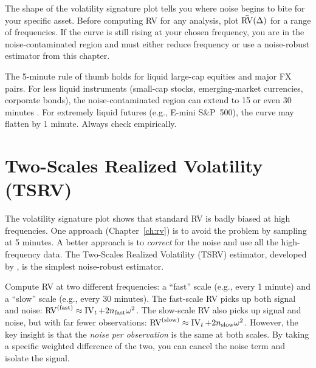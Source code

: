 \begin{keyidea}
The shape of the volatility signature plot tells you where noise begins to bite for your specific asset.
Before computing RV for any analysis, plot $\bar{\operatorname{RV}}(\Delta)$ for a range of frequencies.
If the curve is still rising at your chosen frequency, you are in the noise-contaminated region and must either reduce frequency or use a noise-robust estimator from this chapter.
\end{keyidea}

\begin{warning}
The 5-minute rule of thumb holds for liquid large-cap equities and major FX pairs.
For less liquid instruments (small-cap stocks, emerging-market currencies, corporate bonds), the noise-contaminated region can extend to 15 or even 30 minutes \citep{HansenLunde2006}.
For extremely liquid futures (e.g., E-mini S\&P~500), the curve may flatten by 1 minute.
Always check empirically.
\end{warning}


\section{Two-Scales Realized Volatility (TSRV)}
\label{sec:tsrv}

The volatility signature plot shows that standard RV is badly biased at high frequencies.
One approach (Chapter~\ref{ch:rv}) is to avoid the problem by sampling at 5 minutes.
A better approach is to \emph{correct} for the noise and use all the high-frequency data.
The Two-Scales Realized Volatility (TSRV) estimator, developed by \citet{ZhangMyklandAitSahalia2005}, is the simplest noise-robust estimator.

\begin{intuition}
Compute RV at two different frequencies: a ``fast'' scale (e.g., every 1 minute) and a ``slow'' scale (e.g., every 30 minutes).
The fast-scale RV picks up both signal and noise: $\operatorname{RV}^{(\text{fast})} \approx \operatorname{IV}_t + 2n_{\text{fast}}\omega^2$.
The slow-scale RV also picks up signal and noise, but with far fewer observations: $\operatorname{RV}^{(\text{slow})} \approx \operatorname{IV}_t + 2n_{\text{slow}}\omega^2$.
However, the key insight is that the \emph{noise per observation} is the same at both scales.
By taking a specific weighted difference of the two, you can cancel the noise term and isolate the signal.
\end{intuition}

